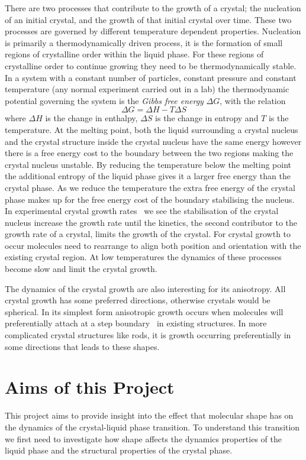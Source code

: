 There are two processes that contribute to the growth of a crystal; the nucleation of an initial crystal, and the growth of that initial crystal over time. These two processes are governed by different temperature dependent properties. Nucleation is primarily a thermodynamically driven process, it is the formation of small regions of crystalline order within the liquid phase. For these regions of crystalline order to continue growing they need to be thermodynamically stable. In a system with a constant number of particles, constant pressure and constant temperature (any normal experiment carried out in a lab) the thermodynamic potential governing the system is the \emph{Gibbs free energy} $\Delta G$, with the relation 
\begin{equation}
\Delta G = \Delta H - T\Delta S
\end{equation}
where $\Delta H$ is the change in enthalpy, $\Delta S$ is the change in entropy and $T$ is the temperature. At the melting point, both the liquid surrounding a crystal nucleus and the crystal structure inside the crystal nucleus have the same energy however there is a free energy cost to the boundary between the two regions making the crystal nucleus unstable. By reducing the temperature below the melting point the additional entropy of the liquid phase gives it a larger free energy than the crystal phase. As we reduce the temperature the extra free energy of the crystal phase makes up for the free energy cost of the boundary stabilising the nucleus. In experimental crystal growth rates~\figref{} we see the stabilisation of the crystal nucleus increase the growth rate until the kinetics, the second contributor to the growth rate of a crystal, limits the growth of the crystal. For crystal growth to occur molecules need to rearrange to align both position and orientation with the existing crystal region. At low temperatures the dynamics of these processes become slow and limit the crystal growth.

The dynamics of the crystal growth are also interesting for its anisotropy. All crystal growth has some preferred directions, otherwise crystals would be spherical. In its simplest form anisotropic growth occurs when molecules will preferentially attach at a step boundary~\figref{} in existing structures. In more complicated crystal structures like rods, it is growth occurring preferentially in some directions that leads to these shapes.


\section{Aims of this Project}

This project aims to provide insight into the effect that molecular shape has on the dynamics of the crystal-liquid phase transition. To understand this transition we first need to investigate how shape affects the dynamics properties of the liquid phase and the structural properties of the crystal phase.
